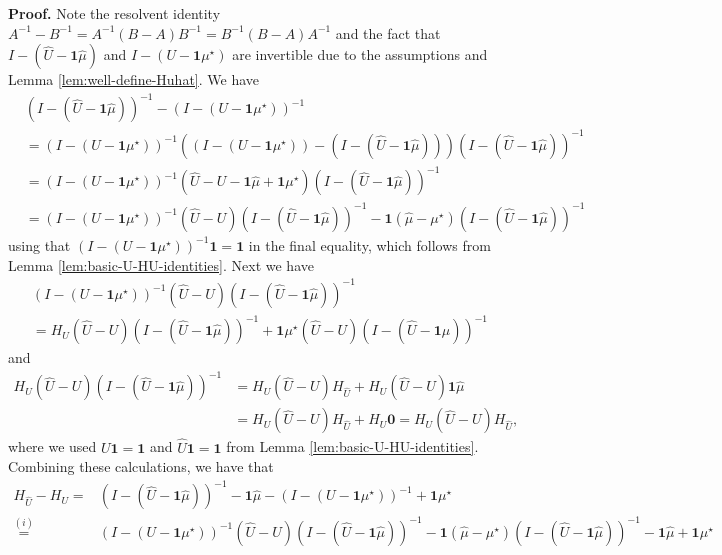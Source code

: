 \documentclass[10pt,a4paper]{amsart}
\renewenvironment{proof}[1]{\par\medskip\noindent\textbf{#1}\enspace\ignorespaces}{\par\medskip}
\newcommand{\muhat}{\widehat{\mu}}
\newcommand{\one}{\mathbf{1}}
\newcommand{\uhat}{\widehat{U}}
\newcommand{\zero}{\mathbf{0}}
\begin{document}
\begin{proof}{Proof.}
    Note the resolvent identity $A^{-1} - B^{-1} = A^{-1}(B-A)B^{-1} = B^{-1} (B-A)A^{-1}$ and the fact that $I - (\uhat - \one \muhat)$ and $I - (U - \one \mu^\star)$ are invertible due to the assumptions and Lemma \ref{lem:well-define-Huhat}. We have
\begin{align}
    & (I - (\uhat - \one \muhat))^{-1}  - (I - (U - \one \mu^\star))^{-1} \nonumber \\
    &= (I - (U - \one \mu^\star))^{-1} \left( (I - (U - \one \mu^\star)) - (I - (\uhat - \one \muhat)) \right) (I - (\uhat - \one \muhat))^{-1}\nonumber \\
    &= (I - (U - \one \mu^\star))^{-1} \left( \uhat - U - \one \muhat + \one \mu^\star \right) (I - (\uhat - \one \muhat))^{-1} \nonumber\\
    &= (I - (U - \one \mu^\star))^{-1} \left( \uhat - U \right) (I - (\uhat - \one \muhat))^{-1} - \one (\muhat - \mu^\star) (I - (\uhat - \one \muhat))^{-1} \label{eq:HU-Huhat_step1}
\end{align}
using that $(I - (U - \one \mu^\star))^{-1} \one = \one$ in the final equality, which follows from Lemma \ref{lem:basic-U-HU-identities}.
Next we have 
\begin{multline}
    (I - (U - \one \mu^\star))^{-1} \left( \uhat - U \right) (I - (\uhat - \one \muhat))^{-1} \\
    = H_U  \left( \uhat - U \right) (I - (\uhat - \one \muhat))^{-1} + \one \mu^\star \left( \uhat - U \right) (I - (\uhat - \one \muhat))^{-1} \label{eq:HU-Huhat_step2}
\end{multline}
and
\begin{align}
    H_U  \left( \uhat - U \right) (I - (\uhat - \one \muhat))^{-1} 
    &= H_U  \left( \uhat - U \right) H_{\uhat}  + H_U  \left( \uhat - U \right) \one \muhat \nonumber\\
    &= H_U  \left( \uhat - U \right) H_{\uhat}  + H_U   \zero 
    = H_U  \left( \uhat - U \right) H_{\uhat}, \label{eq:HU-Huhat_step3}
\end{align}
where we used  $U \one = \one $ and $\uhat \one = \one$ from Lemma \ref{lem:basic-U-HU-identities}.
Combining  these calculations, we have that
\begin{align*}
     H_{\uhat} - H_U 
    =& (I - (\uhat - \one \muhat))^{-1} - \one \muhat  - (I - (U - \one \mu^\star))^{-1} + \one \mu^\star  \\
    \stackrel{(i)}{=}& (I - (U - \one \mu^\star))^{-1} \left( \uhat - U \right) (I - (\uhat - \one \muhat))^{-1} - \one (\muhat - \mu^\star) (I - (\uhat - \one \muhat))^{-1}  - \one \muhat + \one \mu^\star  \\

\end{align*}
\end{proof}
\end{document}
